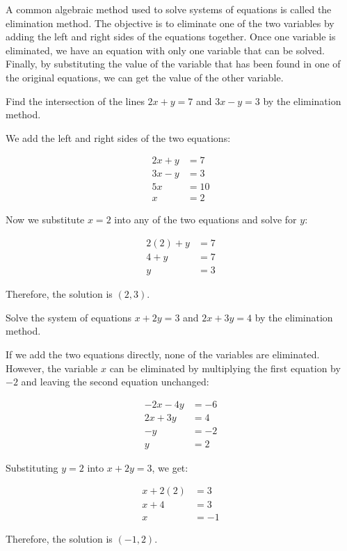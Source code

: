 A common algebraic method used to solve systems of equations is called the elimination method. The objective is to eliminate one of the two variables by adding the left and right sides of the equations together. Once one variable is eliminated, we have an equation with only one variable that can be solved. Finally, by substituting the value of the variable that has been found in one of the original equations, we can get the value of the other variable.

\begin{example}
Find the intersection of the lines $2x + y = 7$ and $3x - y = 3$ by the elimination method.
\end{example}

\begin{solution}
We add the left and right sides of the two equations:

\begin{align*}
2x + y &= 7 \\
3x - y &= 3 \\
5x &= 10 \\
x &= 2
\end{align*}

Now we substitute $x = 2$ into any of the two equations and solve for $y$:

\begin{align*}
2(2) + y &= 7 \\
4 + y &= 7 \\
y &= 3
\end{align*}

Therefore, the solution is $(2, 3)$.
\end{solution}

\begin{example}
Solve the system of equations $x + 2y = 3$ and $2x + 3y = 4$ by the elimination method.
\end{example}

\begin{solution}
If we add the two equations directly, none of the variables are eliminated. However, the variable $x$ can be eliminated by multiplying the first equation by $-2$ and leaving the second equation unchanged:

\begin{align*}
-2x - 4y &= -6 \\
2x + 3y &= 4 \\
-y &= -2 \\
y &= 2
\end{align*}

Substituting $y = 2$ into $x + 2y = 3$, we get:

\begin{align*}
x + 2(2) &= 3 \\
x + 4 &= 3 \\
x &= -1
\end{align*}

Therefore, the solution is $(-1, 2)$.
\end{solution}

